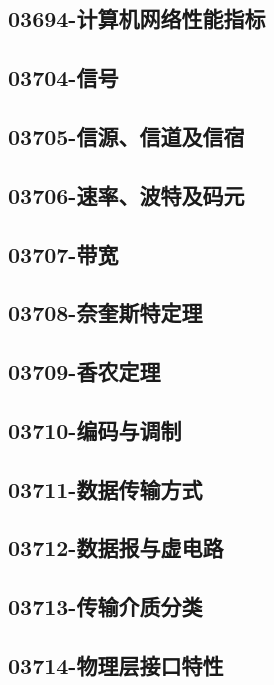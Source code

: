\subsection{03694-计算机网络性能指标}

\subsection{03704-信号}

\subsection{03705-信源、信道及信宿}

\subsection{03706-速率、波特及码元}

\subsection{03707-带宽}

\subsection{03708-奈奎斯特定理}

\subsection{03709-香农定理}

\subsection{03710-编码与调制}

\subsection{03711-数据传输方式}

\subsection{03712-数据报与虚电路}

\subsection{03713-传输介质分类}

\subsection{03714-物理层接口特性}

